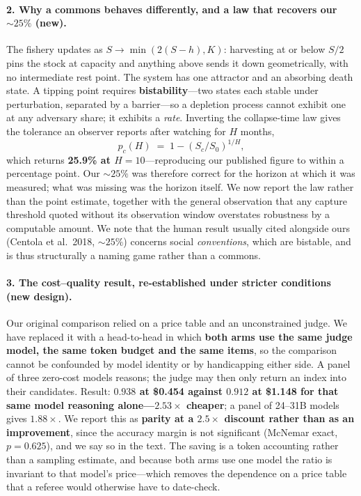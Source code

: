 \documentclass[11pt,a4paper]{article}
\begin{document}
\paragraph{2. Why a commons behaves differently, and a law that recovers our
${\sim}25\%$ (new).}
The fishery updates as $S \to \min(2(S-h),K)$: harvesting at or below $S/2$ pins the
stock at capacity and anything above sends it down geometrically, with no
intermediate rest point. The system has one attractor and an absorbing death state.
A tipping point requires \textbf{bistability}---two states each stable under
perturbation, separated by a barrier---so a depletion process cannot exhibit one at
any adversary share; it exhibits a \emph{rate}. Inverting the collapse-time law
gives the tolerance an observer reports after watching for $H$ months,
\[
  p_c(H) \;=\; 1-\left(S_c/S_0\right)^{1/H},
\]
which returns \textbf{25.9\% at $H=10$}---reproducing our published figure to within
a percentage point. Our ${\sim}25\%$ was therefore correct for the horizon at which
it was measured; what was missing was the horizon itself. We now report the law
rather than the point estimate, together with the general observation that any
capture threshold quoted without its observation window overstates robustness by a
computable amount. We note that the human result usually cited alongside ours
(Centola et al.\ 2018, ${\sim}25\%$) concerns social \emph{conventions}, which are
bistable, and is thus structurally a naming game rather than a commons.

\paragraph{3. The cost--quality result, re-established under stricter conditions
(new design).}
Our original comparison relied on a price table and an unconstrained judge. We have
replaced it with a head-to-head in which \textbf{both arms use the same judge model,
the same token budget and the same items}, so the comparison cannot be confounded by
model identity or by handicapping either side. A panel of three zero-cost models
reasons; the judge may then only return an index into their candidates. Result:
\textbf{$0.938$ at \$0.454 against $0.912$ at \$1.148 for that same model reasoning
alone---$2.53\times$ cheaper}; a panel of 24--31B models gives $1.88\times$. We
report this as \textbf{parity at a $2.5\times$ discount rather than as an
improvement}, since the accuracy margin is not significant (McNemar exact,
$p=0.625$), and we say so in the text. The saving is a token accounting rather than
a sampling estimate, and because both arms use one model the ratio is invariant to
that model's price---which removes the dependence on a price table that a referee
would otherwise have to date-check.
\end{document}
